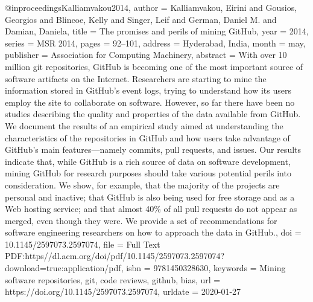 {{{{{{@inproceedings{Kalliamvakou2014,
  author    = {Kalliamvakou, Eirini and Gousios, Georgios and Blincoe, Kelly and Singer, Leif and German, Daniel M. and Damian, Daniela},
  title     = {The promises and perils of mining {GitHub}},
  year      = {2014},
  series    = {{MSR} 2014},
  pages     = {92--101},
  address   = {Hyderabad, India},
  month     = may,
  publisher = {Association for Computing Machinery},
  abstract  = {With over 10 million git repositories, GitHub is becoming one of the most important source of software artifacts on the Internet. Researchers are starting to mine the information stored in GitHub's event logs, trying to understand how its users employ the site to collaborate on software. However, so far there have been no studies describing the quality and properties of the data available from GitHub. We document the results of an empirical study aimed at understanding the characteristics of the repositories in GitHub and how users take advantage of GitHub's main features---namely commits, pull requests, and issues. Our results indicate that, while GitHub is a rich source of data on software development, mining GitHub for research purposes should take various potential perils into consideration. We show, for example, that the majority of the projects are personal and inactive; that GitHub is also being used for free storage and as a Web hosting service; and that almost 40\% of all pull requests do not appear as merged, even though they were. We provide a set of recommendations for software engineering researchers on how to approach the data in GitHub.},
  doi       = {10.1145/2597073.2597074},
  file      = {Full Text PDF:https\://dl.acm.org/doi/pdf/10.1145/2597073.2597074?download=true:application/pdf},
  isbn      = {9781450328630},
  keywords  = {Mining software repositories, git, code reviews, github, bias},
  url       = {https://doi.org/10.1145/2597073.2597074},
  urldate   = {2020-01-27}
}

}}}}}}
